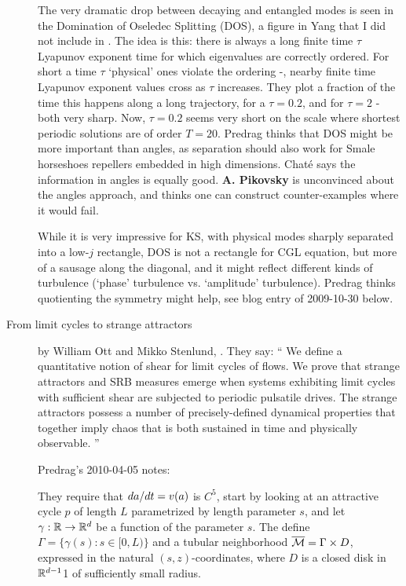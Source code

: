 \begin{description}
The very dramatic drop between decaying and entangled modes is
seen in the Domination of Oseledec Splitting (DOS), a figure in
Yang \etal{} that I did not include in
. The idea is this: there is always a
long finite time $\tau$ Lyapunov exponent time for which
eigenvalues are correctly ordered. For short a time $\tau$
`physical' ones violate the ordering -\ie, nearby finite time
Lyapunov exponent values cross as $\tau$ increases. They plot a
fraction of the time this happens along a long trajectory, for
a $\tau=0.2$, and for $\tau=2$ - both very sharp. Now,
$\tau=0.2$ seems very short on the scale where shortest
periodic solutions are of order $T=20$. Predrag thinks that DOS
might be more important than angles, as separation should also
work for Smale horseshoes repellers embedded in high
dimensions. Chat\'e says the information in angles is equally
good. {\bf A. Pikovsky} is unconvinced about the angles
approach, and thinks one can construct counter-examples where
it would fail.

While it is very impressive for KS, with physical modes sharply
separated into a low-$j$ rectangle, DOS is not a rectangle for
CGL equation, but more of a sausage along the diagonal, and it
might reflect different kinds of turbulence (`phase' turbulence
vs. `amplitude' turbulence). Predrag thinks quotienting the
symmetry might help, see blog entry of 2009-10-30 below.


\item[From limit cycles to strange attractors]
by William Ott and Mikko Stenlund,
.
They say:
``
We define a quantitative notion of shear for limit cycles of
flows. We prove that strange attractors and SRB measures
emerge when systems exhibiting limit cycles with sufficient
shear are subjected to periodic pulsatile drives. The strange
attractors possess a number of precisely-defined dynamical
properties that together imply chaos that is both sustained
in time and physically observable.
''

Predrag's 2010-04-05 notes:

They require that $da/dt = v(a)$ is $C^5$, start by
looking at an attractive cycle $p$ of length $L$ parametrized
by length parameter $s$, and let $\gamma : \mathbb{R} \to
\mathbb{R}^d$ be a function of the parameter $s$. The define
$\Gamma = \{ \gamma(s) : s \in [0,L) \} $ and a tubular
neighborhood $\overline{{\cal M}} =\Gamma \times D$, expressed in
the natural $(s,z )$-coordinates, where $D$ is a closed disk
in $\mathbb{R}^{d-1}$1 of sufficiently small radius.


\end{description}
